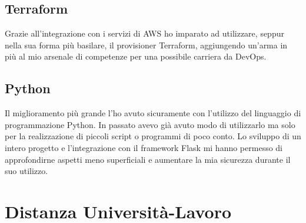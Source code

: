 \subsection{Terraform}
Grazie all'integrazione con i servizi di AWS ho imparato ad utilizzare, seppur nella sua forma più basilare, il provisioner Terraform, aggiungendo un'arma in più al mio arsenale di competenze per una possibile carriera da DevOps.
\subsection{Python}
Il miglioramento più grande l'ho avuto sicuramente con l'utilizzo del linguaggio di programmazione Python. In passato avevo già avuto modo di utilizzarlo ma solo per la realizzazione di piccoli script o programmi di poco conto. Lo sviluppo di un intero progetto e l'integrazione con il \gls{framework} Flask mi hanno permesso di approfondirne aspetti meno superficiali e aumentare la mia sicurezza durante il suo utilizzo. 
\section{Distanza Università-Lavoro}
